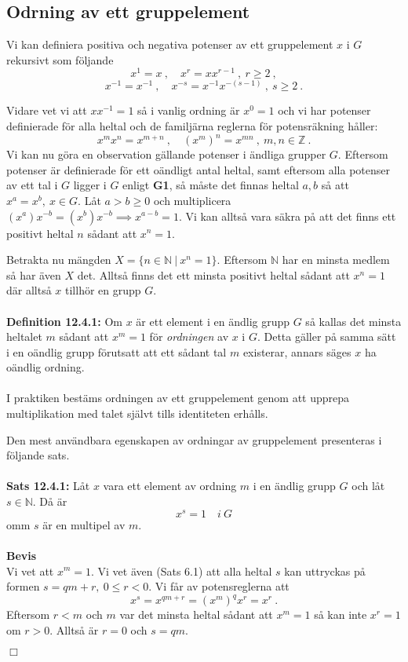 \documentclass{article}
\begin{document}
\subsection{Odrning av ett gruppelement}
Vi kan definiera positiva och negativa potenser av ett gruppelement $x$ i $G$ rekursivt som följande
$$
x^1=x \ , \quad x^r=xx^{r-1} \ , \ r\geq2 \ ,
$$
$$
x^{-1}=x^{-1} \ , \quad x^{-s}=x^{-1}x^{-(s-1)} \ , \ s\geq2 \ .
$$

\noindent
Vidare vet vi att $xx^{-1}=1$ så i vanlig ordning är $x^0=1$ och vi har potenser definierade för alla heltal och de familjärna reglerna för potensräkning håller:
$$
x^mx^n=x^{m+n} \ , \quad (x^m)^n=x^{mn} \ , \ m,n\in\mathbb{Z} \ .
$$
Vi kan nu göra en observation gällande potenser i ändliga grupper $G$. Eftersom potenser är definierade för ett oändligt antal heltal, samt eftersom alla potenser av ett tal i $G$ ligger i $G$ enligt \textbf{G1}, så måste det finnas heltal $a,b$ så att $x^a=x^b, \ x\in G$. Låt $a>b\geq0$ och  multiplicera $(x^a)x^{-b}=(x^b)x^{-b}\implies x^{a-b}=1$. Vi kan alltså vara säkra på att det finns ett positivt heltal $n$ sådant att $x^n=1$.

Betrakta nu mängden $X=\{n\in\mathbb{N} \ | \ x^n=1\}$. Eftersom $\mathbb{N}$ har en minsta medlem så har även $X$ det. Alltså finns det ett minsta positivt heltal sådant att $x^n=1$ där alltså $x$ tillhör en grupp $G$.\\ \\
\textbf{Definition 12.4.1:} Om $x$ är ett element i en ändlig grupp $G$ så kallas det minsta heltalet $m$ sådant att $x^m=1$ för \textit{ordningen} av $x$ i $G$. Detta gäller på samma sätt i en oändlig grupp förutsatt att ett sådant tal $m$ existerar, annars säges $x$ ha oändlig ordning.\\ \\
I praktiken bestäms ordningen av ett gruppelement genom att upprepa multiplikation med talet självt tills identiteten erhålls.

Den mest användbara egenskapen av ordningar av gruppelement presenteras i följande sats.\\ \\ 
\textbf{Sats 12.4.1:} Låt $x$ vara ett element av ordning $m$ i en ändlig grupp $G$ och låt $s\in\mathbb{N}$. Då är
$$
x^s=1 \quad i \ G
$$
omm $s$ är en multipel av $m$.\\ \\ 
\textbf{Bevis}\\ 
Vi vet att $x^m=1$. Vi vet även (Sats 6.1) att alla heltal $s$ kan uttryckas på formen $s=qm+r, \ 0\leq r<0$. Vi får av potensreglerna att
$$
x^s=x^{qm+r}=(x^m)^qx^r=x^r \ .
$$
Eftersom $r<m$ och $m$ var det minsta heltal sådant att $x^m=1$ så kan inte $x^r=1$ om $r>0$. Alltså är $r=0$ och $s=qm$.
\begin{flushright}
$\Box$
\end{flushright}
\end{document}
